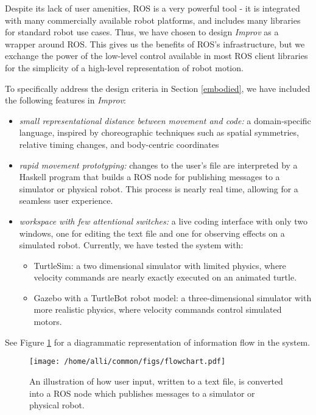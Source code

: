 \documentclass[sigconf]{acmart}
\begin{document}
Despite its lack of user amenities, ROS is a very powerful tool - it is
integrated with many commercially available robot platforms, and includes many
libraries for standard robot use cases. Thus, we have chosen to design
\emph{Improv} as a wrapper around ROS. This gives us the benefits of ROS's
infrastructure, but we exchange the power of the low-level control available in
most ROS client libraries for the simplicity of a high-level representation of
robot motion.

To specifically address the design criteria in Section \ref{embodied}, we have
included the following features in \emph{Improv}:

\begin{itemize}
\item \emph{small representational distance between
movement and code:} a domain-specific language, inspired by choreographic
techniques such as spatial symmetries, relative timing changes, and body-centric
coordinates
\item 
\emph{rapid movement prototyping:} changes to the user's file are interpreted by a 
Haskell program that builds a ROS node for publishing messages to a
simulator or physical robot. This process is nearly real time, allowing for a
seamless user experience.
\item \emph{workspace with few attentional switches:}
a live coding interface with only two windows, one for editing the text file and
one for observing effects on a simulated robot. Currently, we have tested the
system with:
\begin{itemize}
  \item
    TurtleSim: a two dimensional simulator with limited physics, where
    velocity commands are nearly exactly executed on an animated turtle.
  \item
    Gazebo with a TurtleBot robot model: a three-dimensional simulator
    with more realistic physics, where velocity commands control
    simulated motors.
  \end{itemize}
\end{itemize}

See Figure \ref{flowchart} for a diagrammatic representation of
information flow in the system.



\begin{figure}[h]
\centering
\texttt{[image: /home/alli/common/figs/flowchart.pdf]}
\caption{An illustration of how user input, written to a text file, is
converted into a ROS node which publishes messages to a simulator or physical 
robot.
\label{flowchart}}
\end{figure}
\end{document}
